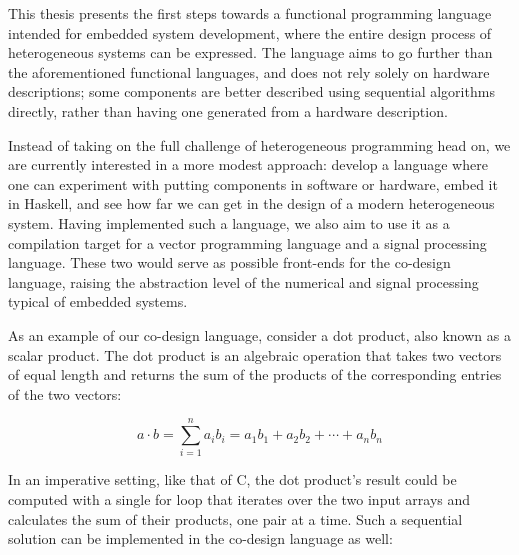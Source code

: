 \documentclass[../main.tex]{subfiles}
\begin{document}
This thesis presents the first steps towards a functional programming language intended for embedded system development, where the entire design process of heterogeneous systems can be expressed. The language aims to go further than the aforementioned functional languages, and does not rely solely on hardware descriptions; some components are better described using sequential algorithms directly, rather than having one generated from a hardware description.

Instead of taking on the full challenge of heterogeneous programming head on, we are currently interested in a more modest approach: develop a language where one can experiment with putting components in software or hardware, embed it in Haskell, and see how far we can get in the design of a modern heterogeneous system. Having implemented such a language, we also aim to use it as a compilation target for a vector programming language and a signal processing language. These two would serve as possible front-ends for the co-design language, raising the abstraction level of the numerical and signal processing typical of embedded systems.


As an example of our co-design language, consider a dot product, also known as a scalar product. The dot product is an algebraic operation that takes two vectors of equal length and returns the sum of the products of the corresponding entries of the two vectors:

\begin{equation}
a \cdot b = \sum_{i=1}^{n}a_{i}b_{i} = a_{1}b_{1} + a_{2}b_{2} + \cdots + a_{n}b_{n}
\end{equation}


In an imperative setting, like that of C, the dot product's result could be computed with a single for loop that iterates over the two input arrays and calculates the sum of their products, one pair at a time. Such a sequential solution can be implemented in the co-design language as well:
\end{document}
